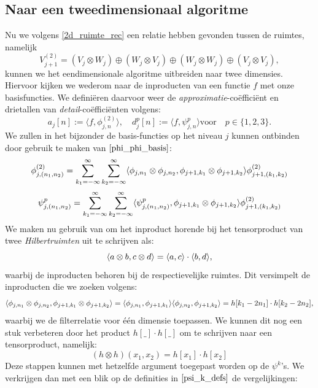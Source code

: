 \subsection{Naar een tweedimensionaal algoritme}
Nu we volgens \eqref{2d_ruimte_rec} een relatie hebben gevonden tussen de ruimtes, namelijk
\begin{equation}
  \label{2d_ruimte_decomp}
V_{j+1}^{(2)} = (V_j\otimes W_j) \oplus (W_j\otimes V_j) \oplus
(W_j\otimes W_j) \oplus (V_j\otimes V_j),
\end{equation}
kunnen we het eendimensionale algoritme uitbreiden naar twee dimensies.
Hiervoor kijken we wederom naar de inproducten van een functie $f$ met onze basisfuncties.
We defini\"eren daarvoor weer de \emph{approximatie}-co\"effici\"ent en drietallen
van \emph{detail}-co\"effici\"enten volgens:
\[
a_j[n] := \langle f, \phi^{(2)}_{j,n} \rangle, 
\quad d^p_j[n] := \langle f, \psi^p_{j,n} \rangle \text{voor} \quad p \in \{1,2,3\}.
\]
We zullen in het bijzonder de basis-functies op het niveau $j$ kunnen ontbinden 
door gebruik te maken van $\eqref{phi_phi_basis}$:
\begin{equation}
  \label{phi_phi_som}
  \phi^{(2)}_{j,(n_1,n_2)} = \sum_{k_1=-\infty}^\infty \sum_{k_2=-\infty}^\infty
  \langle \phi_{j,n_1}\otimes\phi_{j,n_2} , \phi_{j+1,k_1}\otimes\phi_{j+1,k_2} \rangle
  \phi^{(2)}_{j+1,(k_1,k_2)}
\end{equation}
\begin{equation}
  \label{psi_k_som}
  \psi^{p}_{j,(n_1,n_2)} = \sum_{k_1=-\infty}^\infty \sum_{k_2=-\infty}^\infty
  \langle \psi^p_{j,(n_1,n_2)} , \phi_{j+1,k_1}\otimes\phi_{j+1,k_2} \rangle
  \phi^{(2)}_{j+1,(k_1,k_2)}
\end{equation}
We maken nu gebruik van \cite[\S 3.4]{weidmann} om het inproduct horende bij het tensorproduct
van twee \emph{Hilbertruimten} uit te schrijven als:
\[
\langle a\otimes b , c\otimes d \rangle = \langle a , c \rangle\cdot \langle b , d \rangle,
\]
waarbij de inproducten behoren bij de respectievelijke ruimtes.
Dit versimpelt de inproducten die we zoeken volgens:
\[
\langle \phi_{j,n_1}\otimes\phi_{j,n_2} , \phi_{j+1,k_1}\otimes\phi_{j+1,k_2} \rangle
=\langle \phi_{j,n_1} , \phi_{j+1,k_1} \rangle\langle \phi_{j,n_2} , \phi_{j+1,k_2} \rangle
=h[k_1-2n_1]\cdot h[k_2-2n_2],
\]
waarbij we de filterrelatie voor \'e\'en dimensie toepassen. We kunnen dit nog een
stuk verbeteren door het product $h[\_]\cdot h[\_]$ om te schrijven naar een tensorproduct,
namelijk:
\[
(h\otimes h)(x_1,x_2) =  h[x_1]\cdot h[x_2]
\]
Deze stappen kunnen met hetzelfde argument toegepast worden op de $\psi^k$'s.
We verkrijgen dan met een blik op de definities in $\eqref{psi_k_defs}$ de vergelijkingen:
